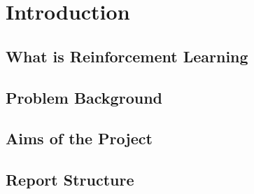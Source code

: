 \section{Introduction}

\subsection{What is Reinforcement Learning}
\subsection{Problem Background}
\subsection{Aims of the Project}
\subsection{Report Structure}
